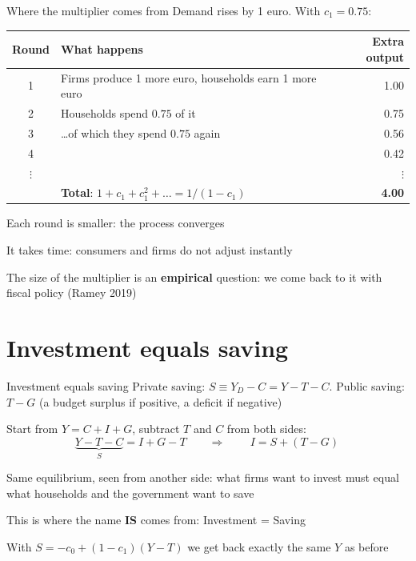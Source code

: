 \documentclass[aspectratio=169,xcolor=table]{beamer}
\begin{document}
\begin{frame}{Where the multiplier comes from}
\footnotesize
Demand rises by 1 euro. With $c_1 = 0.75$:
\vspace{0.1cm}

\centering\footnotesize
\begin{tabular}{clr}
\toprule
\textbf{Round} & \textbf{What happens} & \textbf{Extra output}\\
\midrule
1 & Firms produce 1 more euro, households earn 1 more euro & 1.00 \\
2 & Households spend $0.75$ of it & 0.75 \\
3 & \ldots of which they spend $0.75$ again & 0.56 \\
4 & & 0.42 \\
$\vdots$ & & $\vdots$ \\
\midrule
 & \textbf{Total}: $1 + c_1 + c_1^2 + \ldots = 1/(1-c_1)$ & \textbf{4.00} \\
\bottomrule
\end{tabular}
\vspace{0.15cm}

\raggedright\small
\bi
  \item Each round is smaller: the process converges
  \item It takes time: consumers and firms do not adjust instantly
  \item The size of the multiplier is an \textbf{empirical} question: we come back to it with fiscal policy (Ramey 2019)
\ei
\end{frame}

\section{Investment equals saving}

\begin{frame}{Investment equals saving}
\small
Private saving: $S \equiv Y_D - C = Y - T - C$. Public saving: $T - G$ (a budget surplus if positive, a deficit if negative)
\vspace{0.1cm}

Start from $Y = C + I + G$, subtract $T$ and $C$ from both sides:
\[
\underbrace{Y - T - C}_{S} = I + G - T
\qquad\Longrightarrow\qquad
\boxed{\,I = S + (T - G)\,}
\]
\bi
  \item Same equilibrium, seen from another side: what firms want to invest must equal what households and the government want to save
  \item This is where the name \textbf{IS} comes from: Investment = Saving
  \item With $S = -c_0 + (1-c_1)(Y-T)$ we get back exactly the same $Y$ as before
\ei
{}
\end{frame}
\end{document}

